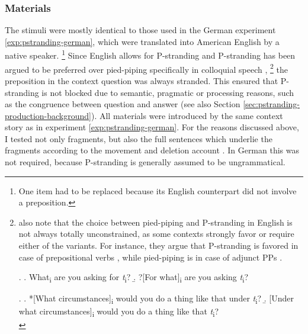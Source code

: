 \subsubsection{Materials} \label{sec:pstranding-english-materials}
The stimuli were mostly identical to those used in the German experiment \ref{exp:pstranding-german}, which were translated into American English by a native speaker.%
%
\footnote{One item had to be replaced because its English counterpart did not involve a preposition.}\afterfn%
%
Since English allows for P-stranding and P-stranding has been argued to be preferred over pied-piping specifically in colloquial speech \citep[628]{pullum.huddleston2002},%
%
\footnote{\label{fn:piedpiping-en-restrictions}\citet[628--631]{pullum.huddleston2002} also note that the choice between pied-piping and P-stranding in English is not always totally unconstrained, as some contexts strongly favor or require either of the variants. For instance, they argue that P-stranding is favored in case of prepositional verbs \Next, while pied-piping is in case of adjunct PPs \NNext.

\ex. \a. What\textsubscript{i} are you asking for \textit{t}\textsubscript{i}? \hfill \citep[629]{pullum.huddleston2002}
     \b. ?[For what]\textsubscript{i} are you asking \textit{t}\textsubscript{i}?
     
\ex. \a. *[What circumstances]\textsubscript{i} would you do a thing like that under \textit{t}\textsubscript{i}? 
     \b. [Under what circumstances]\textsubscript{i} would you do a thing like that \textit{t}\textsubscript{i}?\\\mbox{} \hfill \citep[631]{pullum.huddleston2002}
     
}\afterfn%
%
the preposition in the context question was always stranded. This ensured that P-stranding is not blocked due to semantic, pragmatic or processing reasons, such as the congruence between question and answer (see also Section \ref{sec:pstranding-production-background}). All materials were introduced by the same context story as in experiment \ref{exp:pstranding-german}. For the reasons discussed above, I tested not only fragments, but also the full sentences which underlie the fragments according to the movement and deletion account \Next. In German this was not required, because P-stranding is generally assumed to be ungrammatical.

